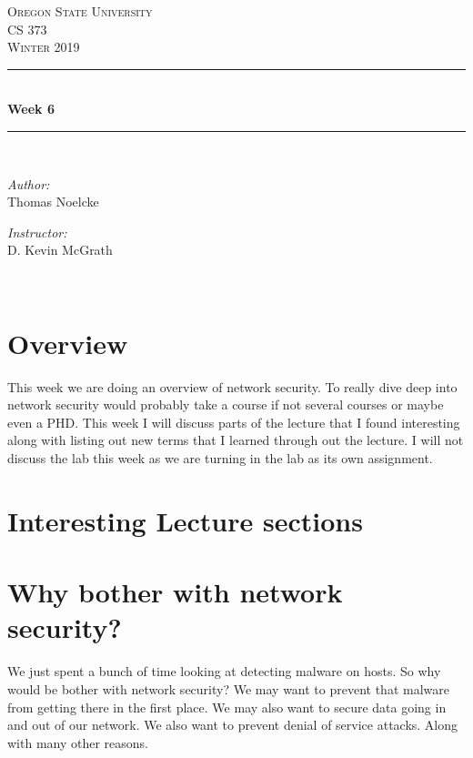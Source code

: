 \documentclass[letterpaper, onecolumn,10pt]{IEEEtran}
\begin{document}
    \begin{titlepage}
    \newcommand{\HRule}{\rule{\linewidth}{0.5mm}}
    \center
    \textsc{\Large Oregon State University}\\[1.5cm]
    \textsc{\Large CS 373}\\[0.5cm]
    \textsc{\Large Winter 2019}\\[0.5cm]
    \HRule \\[0.4cm]
    { \huge \bfseries Week 6}\\[0.4cm] %
    \HRule \\[1.5cm]
    \begin{minipage}{0.4\textwidth}
        \begin{flushleft} \large
        \emph{Author:}\\
        Thomas Noelcke
        \end{flushleft}
    \end{minipage}
    \begin{minipage}{0.4\textwidth}
        \begin{flushright} \large
        \emph{Instructor:} \\
        D. Kevin McGrath\\
        \end{flushright}
    \end{minipage}\\[2cm]
		\end{titlepage}
		
		
		\section{Overview}
		This week we are doing an overview of network security. To really dive deep into network security would probably take a course if not several courses or maybe even a PHD. This week I will discuss parts of the lecture that I found interesting along with listing out new terms that I learned through out the lecture. I will not discuss the lab this week as we are turning in the lab as its own assignment.\\
		
		\section{Interesting Lecture sections}
			
			\section{Why bother with network security?}
			We just spent a bunch of time looking at detecting malware on hosts. So why would be bother with network security? We may want to prevent that malware from getting there in the first place. We may also want to secure data going in and out of our network. We also want to prevent denial of service attacks. Along with many other reasons.\\
			
\end{document}
